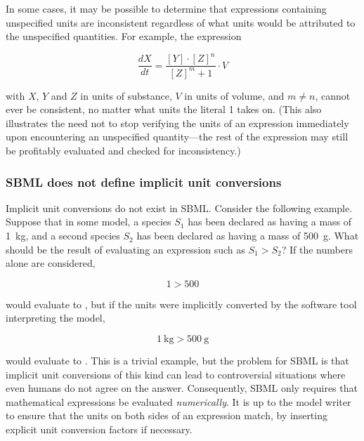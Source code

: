 In some cases, it may be possible to determine that expressions
containing unspecified units are inconsistent regardless of what
units would be attributed to the unspecified quantities.  For
example, the expression
\begin{linenomath}
  \begin{equation*}
    \frac{dX}{dt} = \frac{[Y] \cdot [Z]^n}{[Z]^m + 1} \cdot V
  \end{equation*}
\end{linenomath}
with $X$, $Y$ and $Z$ in units of substance, $V$ in
units of volume, and $m \neq n$, cannot ever be consistent, no
matter what units the literal 1 takes on.  (This also illustrates
the need not to stop verifying the units of an expression
immediately upon encountering an unspecified quantity---the rest
of the expression may still be profitably evaluated and checked
for inconsistency.)


\subsubsection{SBML does not define implicit unit conversions}
\label{sec:no-implicit-conversions}

Implicit unit conversions do not exist in SBML.  Consider the
following example.  Suppose that in some model, a species $S_1$
has been declared as having a mass of 1~kg, and a second species
$S_2$ has been declared as having a mass of 500~g.  What should be
the result of evaluating an expression such as $S_1 > S_2$?  If
the numbers alone are considered,
\begin{linenomath}
  \begin{equation*}
    1 > 500
  \end{equation*}
\end{linenomath}
would evaluate to , but if the units were implicitly
converted by the software tool interpreting the model,
\begin{linenomath}
  \begin{equation*}
    1~\mathrm{kg} > 500~\mathrm{g}
  \end{equation*}
\end{linenomath}
would evaluate to .  This is a trivial example, but the
problem for SBML is that implicit unit conversions of this kind
can lead to controversial situations where even humans do not
agree on the answer.  Consequently, SBML only requires that
mathematical expressions be evaluated \emph{numerically}.  It is
up to the model writer to ensure that the units on both sides of
an expression match, by inserting explicit unit conversion factors
if necessary.
